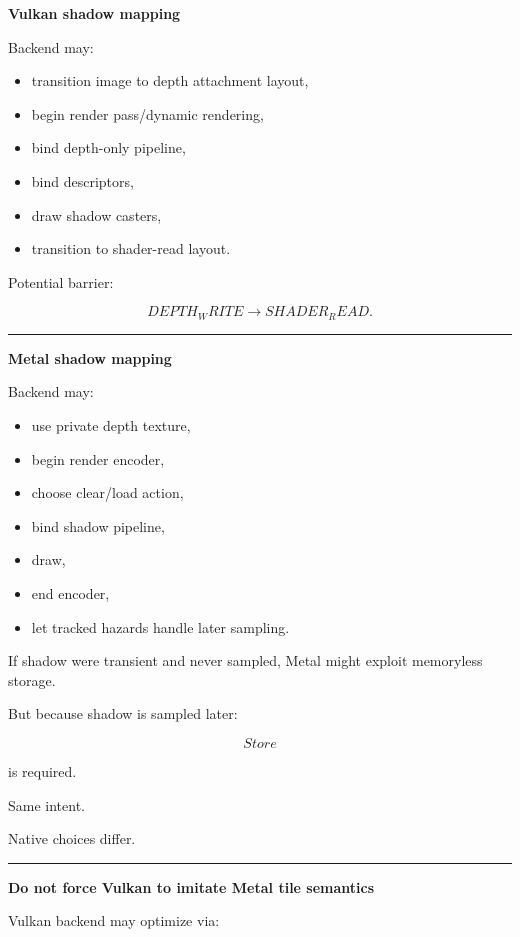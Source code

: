 \textbf{Vulkan shadow mapping}

Backend may:

\begin{itemize}
\tightlist
\item
  transition image to depth attachment layout,
\item
  begin render pass/dynamic rendering,
\item
  bind depth-only pipeline,
\item
  bind descriptors,
\item
  draw shadow casters,
\item
  transition to shader-read layout.
\end{itemize}

Potential barrier:

\[
DEPTH_WRITE
\rightarrow
SHADER_READ.
\]

\begin{center}\rule{0.5\linewidth}{0.5pt}\end{center}

\textbf{Metal shadow mapping}

Backend may:

\begin{itemize}
\tightlist
\item
  use private depth texture,
\item
  begin render encoder,
\item
  choose clear/load action,
\item
  bind shadow pipeline,
\item
  draw,
\item
  end encoder,
\item
  let tracked hazards handle later sampling.
\end{itemize}

If shadow were transient and never sampled, Metal might exploit memoryless storage.

But because shadow is sampled later:

\[
Store
\]

is required.

Same intent.

Native choices differ.

\begin{center}\rule{0.5\linewidth}{0.5pt}\end{center}

\textbf{Do not force Vulkan to imitate Metal tile semantics}

Vulkan backend may optimize via:

